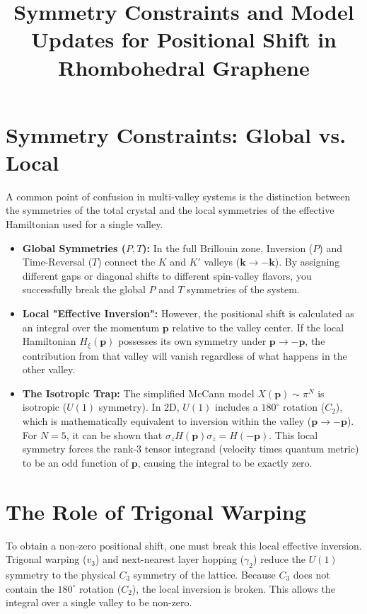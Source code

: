 \documentclass{article}
\title{Symmetry Constraints and Model Updates for Positional Shift in Rhombohedral Graphene}
\begin{document}
\maketitle

\section{Symmetry Constraints: Global vs. Local}

A common point of confusion in multi-valley systems is the distinction between the symmetries of the total crystal and the local symmetries of the effective Hamiltonian used for a single valley.

\begin{itemize}
    \item \textbf{Global Symmetries ($P, T$):} In the full Brillouin zone, Inversion ($P$) and Time-Reversal ($T$) connect the $K$ and $K'$ valleys ($\mathbf{k} \to -\mathbf{k}$). By assigning different gaps or diagonal shifts to different spin-valley flavors, you successfully break the global $P$ and $T$ symmetries of the system.
    
    \item \textbf{Local "Effective Inversion":} However, the positional shift is calculated as an integral over the momentum $\mathbf{p}$ relative to the valley center. If the local Hamiltonian $H_\xi(\mathbf{p})$ possesses its own symmetry under $\mathbf{p} \to -\mathbf{p}$, the contribution from that valley will vanish regardless of what happens in the other valley.
    
    \item \textbf{The Isotropic Trap:} The simplified McCann model $X(\mathbf{p}) \sim \pi^N$ is isotropic ($U(1)$ symmetry). In 2D, $U(1)$ includes a $180^\circ$ rotation ($C_2$), which is mathematically equivalent to inversion within the valley ($\mathbf{p} \to -\mathbf{p}$). 
    For $N=5$, it can be shown that $\sigma_z H(\mathbf{p}) \sigma_z = H(-\mathbf{p})$. This local symmetry forces the rank-3 tensor integrand (velocity times quantum metric) to be an odd function of $\mathbf{p}$, causing the integral to be exactly zero.
\end{itemize}

\section{The Role of Trigonal Warping}

To obtain a non-zero positional shift, one must break this local effective inversion. Trigonal warping ($v_3$) and next-nearest layer hopping ($\gamma_2$) reduce the $U(1)$ symmetry to the physical $C_3$ symmetry of the lattice. Because $C_3$ does not contain the $180^\circ$ rotation ($C_2$), the local inversion is broken. This allows the integral over a single valley to be non-zero. 
\end{document}
